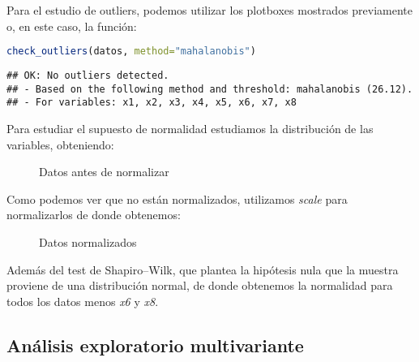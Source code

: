 \documentclass[11pt,a4paper]{article}
\begin{document}
Para el estudio de outliers, podemos utilizar los plotboxes mostrados previamente o, en este caso, la función:
\begin{lstlisting}[language=R]
check_outliers(datos, method="mahalanobis")
\end{lstlisting}
\begin{verbatim}
## OK: No outliers detected.
## - Based on the following method and threshold: mahalanobis (26.12).
## - For variables: x1, x2, x3, x4, x5, x6, x7, x8
\end{verbatim}

Para estudiar el supuesto de normalidad estudiamos la distribución de las variables, obteniendo:
\begin{figure}[H]
\centering
{}
\caption{Datos antes de normalizar}
\end{figure}

Como podemos ver que no están normalizados, utilizamos \emph{scale} para normalizarlos de donde obtenemos:
\begin{figure}[H]
\centering
{}
\caption{Datos normalizados}
\end{figure}

Además del test de Shapiro–Wilk, que plantea la hipótesis nula que la muestra proviene de una distribución normal, de donde obtenemos la normalidad para todos los datos menos \emph{x6} y \emph{x8}.

\subsection{Análisis exploratorio multivariante}
\end{document}

